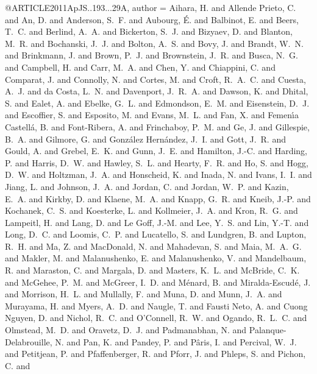 \documentclass[twocolumn]{aastex62}
\begin{document}
@ARTICLE{2011ApJS..193...29A,
   author = {{Aihara}, H. and {Allende Prieto}, C. and {An}, D. and {Anderson}, S.~F. and 
	{Aubourg}, {\'E}. and {Balbinot}, E. and {Beers}, T.~C. and 
	{Berlind}, A.~A. and {Bickerton}, S.~J. and {Bizyaev}, D. and 
	{Blanton}, M.~R. and {Bochanski}, J.~J. and {Bolton}, A.~S. and 
	{Bovy}, J. and {Brandt}, W.~N. and {Brinkmann}, J. and {Brown}, P.~J. and 
	{Brownstein}, J.~R. and {Busca}, N.~G. and {Campbell}, H. and 
	{Carr}, M.~A. and {Chen}, Y. and {Chiappini}, C. and {Comparat}, J. and 
	{Connolly}, N. and {Cortes}, M. and {Croft}, R.~A.~C. and {Cuesta}, A.~J. and 
	{da Costa}, L.~N. and {Davenport}, J.~R.~A. and {Dawson}, K. and 
	{Dhital}, S. and {Ealet}, A. and {Ebelke}, G.~L. and {Edmondson}, E.~M. and 
	{Eisenstein}, D.~J. and {Escoffier}, S. and {Esposito}, M. and 
	{Evans}, M.~L. and {Fan}, X. and {Femen{\'{\i}}a Castell{\'a}}, B. and 
	{Font-Ribera}, A. and {Frinchaboy}, P.~M. and {Ge}, J. and {Gillespie}, B.~A. and 
	{Gilmore}, G. and {Gonz{\'a}lez Hern{\'a}ndez}, J.~I. and {Gott}, J.~R. and 
	{Gould}, A. and {Grebel}, E.~K. and {Gunn}, J.~E. and {Hamilton}, J.-C. and 
	{Harding}, P. and {Harris}, D.~W. and {Hawley}, S.~L. and {Hearty}, F.~R. and 
	{Ho}, S. and {Hogg}, D.~W. and {Holtzman}, J.~A. and {Honscheid}, K. and 
	{Inada}, N. and {Ivans}, I.~I. and {Jiang}, L. and {Johnson}, J.~A. and 
	{Jordan}, C. and {Jordan}, W.~P. and {Kazin}, E.~A. and {Kirkby}, D. and 
	{Klaene}, M.~A. and {Knapp}, G.~R. and {Kneib}, J.-P. and {Kochanek}, C.~S. and 
	{Koesterke}, L. and {Kollmeier}, J.~A. and {Kron}, R.~G. and 
	{Lampeitl}, H. and {Lang}, D. and {Le Goff}, J.-M. and {Lee}, Y.~S. and 
	{Lin}, Y.-T. and {Long}, D.~C. and {Loomis}, C.~P. and {Lucatello}, S. and 
	{Lundgren}, B. and {Lupton}, R.~H. and {Ma}, Z. and {MacDonald}, N. and 
	{Mahadevan}, S. and {Maia}, M.~A.~G. and {Makler}, M. and {Malanushenko}, E. and 
	{Malanushenko}, V. and {Mandelbaum}, R. and {Maraston}, C. and 
	{Margala}, D. and {Masters}, K.~L. and {McBride}, C.~K. and 
	{McGehee}, P.~M. and {McGreer}, I.~D. and {M{\'e}nard}, B. and 
	{Miralda-Escud{\'e}}, J. and {Morrison}, H.~L. and {Mullally}, F. and 
	{Muna}, D. and {Munn}, J.~A. and {Murayama}, H. and {Myers}, A.~D. and 
	{Naugle}, T. and {Fausti Neto}, A. and {Cuong Nguyen}, D. and 
	{Nichol}, R.~C. and {O'Connell}, R.~W. and {Ogando}, R.~L.~C. and 
	{Olmstead}, M.~D. and {Oravetz}, D.~J. and {Padmanabhan}, N. and 
	{Palanque-Delabrouille}, N. and {Pan}, K. and {Pandey}, P. and 
	{P{\^a}ris}, I. and {Percival}, W.~J. and {Petitjean}, P. and 
	{Pfaffenberger}, R. and {Pforr}, J. and {Phleps}, S. and {Pichon}, C. and 
}}
\end{document}
